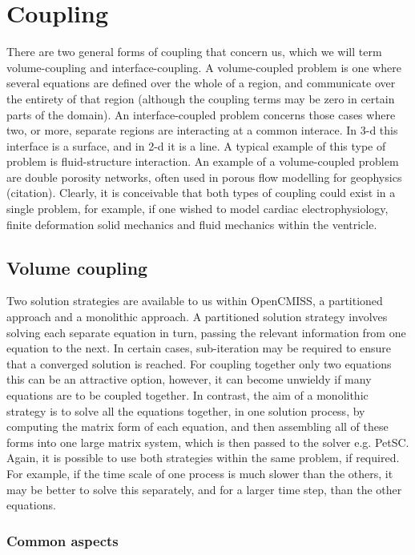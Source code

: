 \chapter{Coupling}
\label{cha:coupling}

There are two general forms of coupling that concern us, which we will term volume-coupling and interface-coupling. A volume-coupled problem is one where several equations are defined over the whole of a region, and communicate over the entirety of that region (although the coupling terms may be zero in certain parts of the domain). An interface-coupled problem concerns those cases where two, or more, separate regions are interacting at a common interace. In 3-d this interface is a surface, and in 2-d it is a line. A typical example of this type of problem is fluid-structure interaction. An example of a volume-coupled problem are double porosity networks, often used in porous flow modelling for geophysics (citation). Clearly, it is conceivable that both types of coupling could exist in a single problem, for example, if one wished to model cardiac electrophysiology, finite deformation solid mechanics and fluid mechanics within the ventricle.

\section{Volume coupling}

Two solution strategies are available to us within OpenCMISS, a partitioned approach and a monolithic approach. A partitioned solution strategy involves solving each separate equation in turn, passing the relevant information from one equation to the next. In certain cases, sub-iteration may be required to ensure that a converged solution is reached. For coupling together only two equations this can be an attractive option, however, it can become unwieldy if many equations are to be coupled together. In contrast, the aim of a monolithic strategy is to solve all the equations together, in one solution process, by computing the matrix form of each equation, and then assembling all of these forms into one large matrix system, which is then passed to the solver e.g. PetSC. Again, it is possible to use both strategies within the same problem, if required. For example, if the time scale of one process is much slower than the others, it may be better to solve this separately, and for a larger time step, than the other equations. 

\subsection{Common aspects}

